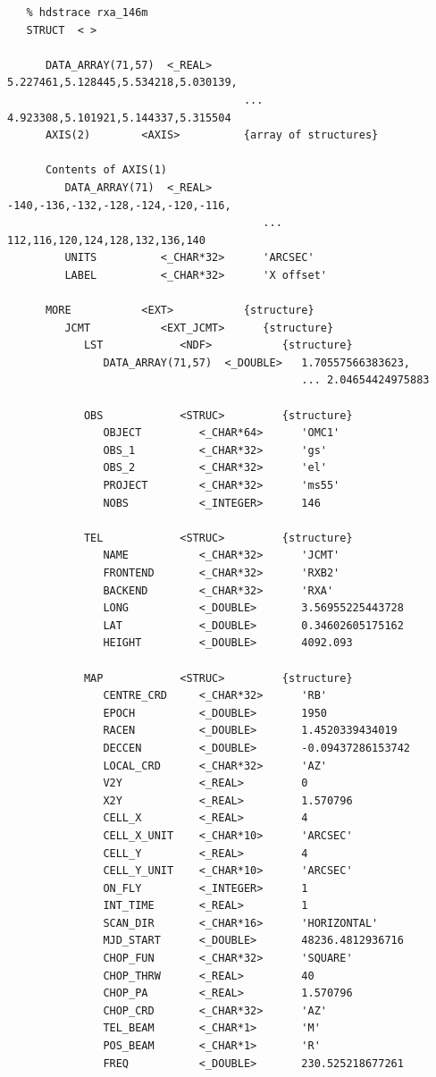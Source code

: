 \documentclass[11pt]{article}
\begin{document}
\begin{verbatim}
   % hdstrace rxa_146m
   STRUCT  < >

      DATA_ARRAY(71,57)  <_REAL>     5.227461,5.128445,5.534218,5.030139,
                                     ... 4.923308,5.101921,5.144337,5.315504
      AXIS(2)        <AXIS>          {array of structures}

      Contents of AXIS(1)
         DATA_ARRAY(71)  <_REAL>        -140,-136,-132,-128,-124,-120,-116,
                                        ... 112,116,120,124,128,132,136,140
         UNITS          <_CHAR*32>      'ARCSEC'
         LABEL          <_CHAR*32>      'X offset'

      MORE           <EXT>           {structure}
         JCMT           <EXT_JCMT>      {structure}
            LST            <NDF>           {structure}
               DATA_ARRAY(71,57)  <_DOUBLE>   1.70557566383623,
                                              ... 2.04654424975883

            OBS            <STRUC>         {structure}
               OBJECT         <_CHAR*64>      'OMC1'
               OBS_1          <_CHAR*32>      'gs'
               OBS_2          <_CHAR*32>      'el'
               PROJECT        <_CHAR*32>      'ms55'
               NOBS           <_INTEGER>      146

            TEL            <STRUC>         {structure}
               NAME           <_CHAR*32>      'JCMT'
               FRONTEND       <_CHAR*32>      'RXB2'
               BACKEND        <_CHAR*32>      'RXA'
               LONG           <_DOUBLE>       3.56955225443728
               LAT            <_DOUBLE>       0.34602605175162
               HEIGHT         <_DOUBLE>       4092.093

            MAP            <STRUC>         {structure}
               CENTRE_CRD     <_CHAR*32>      'RB'
               EPOCH          <_DOUBLE>       1950
               RACEN          <_DOUBLE>       1.4520339434019
               DECCEN         <_DOUBLE>       -0.09437286153742
               LOCAL_CRD      <_CHAR*32>      'AZ'
               V2Y            <_REAL>         0
               X2Y            <_REAL>         1.570796
               CELL_X         <_REAL>         4
               CELL_X_UNIT    <_CHAR*10>      'ARCSEC'
               CELL_Y         <_REAL>         4
               CELL_Y_UNIT    <_CHAR*10>      'ARCSEC'
               ON_FLY         <_INTEGER>      1
               INT_TIME       <_REAL>         1
               SCAN_DIR       <_CHAR*16>      'HORIZONTAL'
               MJD_START      <_DOUBLE>       48236.4812936716
               CHOP_FUN       <_CHAR*32>      'SQUARE'
               CHOP_THRW      <_REAL>         40
               CHOP_PA        <_REAL>         1.570796
               CHOP_CRD       <_CHAR*32>      'AZ'
               TEL_BEAM       <_CHAR*1>       'M'
               POS_BEAM       <_CHAR*1>       'R'
               FREQ           <_DOUBLE>       230.525218677261


\end{verbatim}
\end{document}
